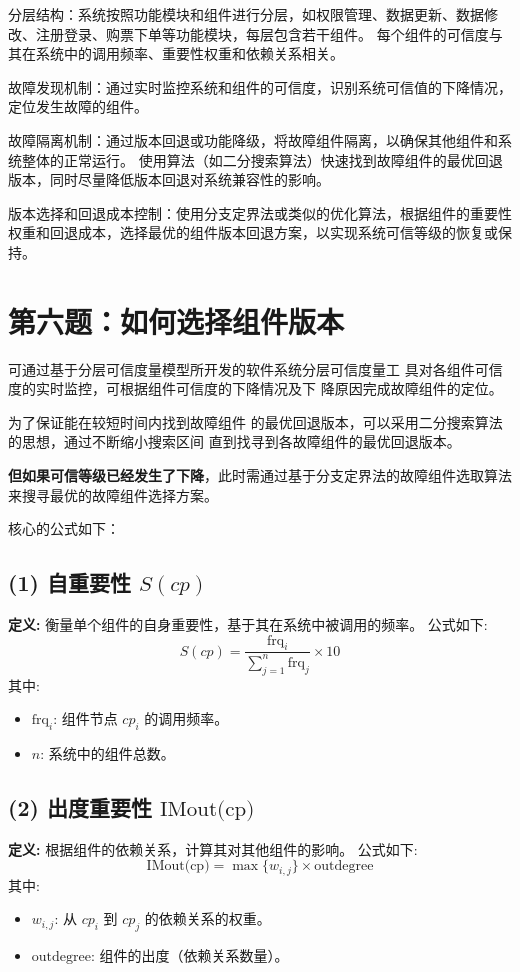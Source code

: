 \documentclass[14pt,a4paper,UTF8,twoside]{article}
\begin{document}
分层结构：系统按照功能模块和组件进行分层，如权限管理、数据更新、数据修改、注册登录、购票下单等功能模块，每层包含若干组件。
每个组件的可信度与其在系统中的调用频率、重要性权重和依赖关系相关。

故障发现机制：通过实时监控系统和组件的可信度，识别系统可信值的下降情况，定位发生故障的组件。

故障隔离机制：通过版本回退或功能降级，将故障组件隔离，以确保其他组件和系统整体的正常运行。
使用算法（如二分搜索算法）快速找到故障组件的最优回退版本，同时尽量降低版本回退对系统兼容性的影响。

版本选择和回退成本控制：使用分支定界法或类似的优化算法，根据组件的重要性权重和回退成本，选择最优的组件版本回退方案，以实现系统可信等级的恢复或保持。

\section{第六题：如何选择组件版本}

可通过基于分层可信度量模型所开发的软件系统分层可信度量工
具对各组件可信度的实时监控，可根据组件可信度的下降情况及下
降原因完成故障组件的定位。

为了保证能在较短时间内找到故障组件
的最优回退版本，可以采用二分搜索算法的思想，通过不断缩小搜索区间
直到找寻到各故障组件的最优回退版本。

\textbf{但如果可信等级已经发生了下降}，此时需通过基于分支定界法的故障组件选取算法
来搜寻最优的故障组件选择方案。

核心的公式如下：

\subsection*{(1) 自重要性 \(S(cp)\)}
\textbf{定义:} 衡量单个组件的自身重要性，基于其在系统中被调用的频率。  
公式如下:
\[
S(cp) = \frac{\text{frq}_i}{\sum_{j=1}^n \text{frq}_j} \times 10
\]
其中:
\begin{itemize}
    \item \(\text{frq}_i\): 组件节点 \(cp_i\) 的调用频率。
    \item \(n\): 系统中的组件总数。
\end{itemize}

\subsection*{(2) 出度重要性 \(\text{IMout(cp)}\)}
\textbf{定义:} 根据组件的依赖关系，计算其对其他组件的影响。  
公式如下:
\[
\text{IMout(cp)} = \max \{w_{i,j}\} \times \text{outdegree}
\]
其中:
\begin{itemize}
    \item \(w_{i,j}\): 从 \(cp_i\) 到 \(cp_j\) 的依赖关系的权重。
    \item \(\text{outdegree}\): 组件的出度（依赖关系数量）。
\end{itemize}
\end{document}
